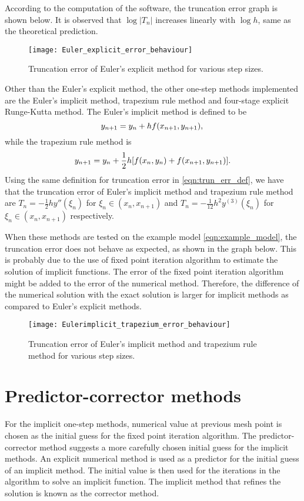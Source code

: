 According to the computation of the software, the truncation error graph is shown below. It is observed that $\log |T_n|$ increases linearly with $\log h$, same as the theoretical prediction. 

\begin{figure}
    \texttt{[image: Euler\_explicit\_error\_behaviour]}
    \caption{Truncation error of Euler's explicit method for various step sizes.}
    \label{fig:Euler_explicit_error_behaviour}
\end{figure}

Other than the Euler's explicit method, the other one-step methods implemented are the Euler's implicit method, trapezium rule method and four-stage explicit Runge-Kutta method. The Euler's implicit method is defined to be
\begin{equation}
    y_{n+1} = y_n + hf(x_{n+1},y_{n+1}),\\
\end{equation}
while the trapezium rule method is
\begin{equation}
    y_{n+1} = y_n + \frac{1}{2}h[f(x_n,y_n) + f(x_{n+1},y_{n+1})].\\
\end{equation}
Using the same definition for truncation error in \ref{eqn:trun_err_def}, we have that the truncation error of Euler's implicit method and trapezium rule method are $T_n = -\frac{1}{2}hy''(\xi_n)$ for $\xi_n \in (x_n, x_{n+1})$ and $T_n = -\frac{1}{12}h^2y^{(3)}(\xi_n)$ for $\xi_n \in (x_n, x_{n+1})$ respectively.

When these methods are tested on the example model \ref{eqn:example_model}, the truncation error does not behave as expected, as shown in the graph below. This is probably due to the use of fixed point iteration algorithm to estimate the solution of implicit functions. The error of the fixed point iteration algorithm might be added to the error of the numerical method. Therefore, the difference of the numerical solution with the exact solution is larger for implicit methods as compared to Euler's explicit methods.

\begin{figure}
    \texttt{[image: Eulerimplicit\_trapezium\_error\_behaviour]}
    \caption{Truncation error of Euler's implicit method and trapezium rule method for various step sizes.}
    \label{fig:Eulerimplicit_trapezium_error_behaviour}
\end{figure}

\section{Predictor-corrector methods}
\label{sec:predictor-corrector}
For the implicit one-step methods, numerical value at previous mesh point is chosen as the initial guess for the fixed point iteration algorithm. The predictor-corrector method suggests a more carefully chosen initial guess for the implicit methods. An explicit numerical method is used as a predictor for the initial guess of an implicit method. The initial value is then used for the iterations in the algorithm to solve an implicit function. The implicit method that refines the solution is known as the corrector method. 


